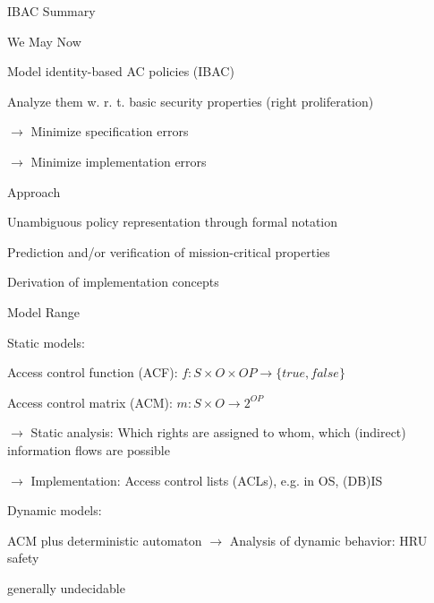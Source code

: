 \documentclass[a4paper]{article}
\begin{document}
\begin{multicols}{3}
    IBAC Summary
    \begin{itemize*}
        \item We May Now
        \begin{itemize*}
            \item Model identity-based AC policies (IBAC)
            \item Analyze them w. r. t. basic security properties (right proliferation)
            \item $\rightarrow$  Minimize specification errors
            \item $\rightarrow$  Minimize implementation errors
        \end{itemize*}
        \item Approach
        \begin{itemize*}
            \item Unambiguous policy representation through formal notation
            \item Prediction and/or verification of mission-critical properties
            \item Derivation of implementation concepts
        \end{itemize*}
        \item Model Range
        \begin{itemize*}
            \item Static models:
            \begin{itemize*}
                \item Access control function (ACF): $f:S\times O\times OP\rightarrow \{true,false\}$
                \item Access control matrix (ACM): $m:S\times O\rightarrow 2^{OP}$
                \item $\rightarrow$ Static analysis: Which rights are assigned to whom, which (indirect) information flows are possible
                \item $\rightarrow$ Implementation: Access control lists (ACLs), e.g. in OS, (DB)IS
            \end{itemize*}
            \item Dynamic models:
            \begin{itemize*}
                \item ACM plus deterministic automaton $\rightarrow$ Analysis of dynamic behavior: HRU safety
                \begin{itemize*}
                    \item generally undecidable

\end{itemize*}
\end{itemize*}
\end{itemize*}
\end{itemize*}
\end{multicols}
\end{document}

